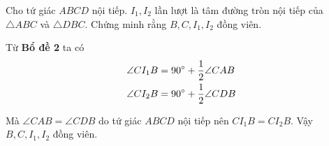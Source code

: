 \begin{prob}
	Cho tứ giác $ABCD$ nội tiếp. $I_1, I_2$ lần lượt là tâm đường tròn nội tiếp của $\triangle ABC$ và $\triangle DBC$. Chứng minh rằng $B, C, I_1, I_2$ đồng viên.
\end{prob}

\begin{center}

\end{center}

Từ \textbf{Bổ đề 2} ta có 
\begin{align*}
	\angle CI_1B &= 90 \degree + \frac{1}{2} \angle CAB \\ 
	\angle CI_2B &= 90 \degree + \frac{1}{2} \angle CDB
\end{align*}

Mà $\angle CAB = \angle CDB$ do tứ giác $ABCD$ nội tiếp nên $CI_1B = CI_2B$. Vậy $B, C, I_1, I_2$ đồng viên.